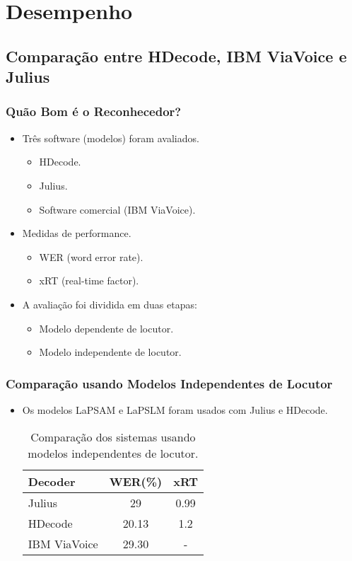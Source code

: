 \documentclass{beamer}
\begin{document}
\section{Desempenho}
\subsection[Comparação]{Comparação entre HDecode, IBM ViaVoice e Julius}
\begin{frame}
   \frametitle{Quão Bom é o Reconhecedor?}
   \begin{itemize}
      \item Três software (modelos) foram avaliados.
      \begin{itemize}
	 \item HDecode.
	 \item Julius.
	 \item Software comercial (IBM ViaVoice).
      \end{itemize}

      \item Medidas de performance.
      \begin{itemize}
	 \item WER (word error rate).
	 \item xRT (real-time factor).
      \end{itemize}

      \item A avaliação foi dividida em duas etapas:
      \begin{itemize}
	 \item Modelo dependente de locutor.
	 \item Modelo independente de locutor.
      \end{itemize}
   \end{itemize}
\end{frame}

\begin{frame}
   \frametitle{Comparação usando Modelos Independentes de Locutor}
   \begin{itemize}
      \item Os modelos LaPSAM e LaPSLM foram usados com Julius e HDecode.
      \begin{table}
	 \centering
	 \begin{tabular}{ l c c }
	    \toprule
	    \textbf{Decoder} & \textbf{WER(\%)} & \textbf{xRT} \\\midrule
	    Julius & 29 & 0.99 \\\midrule
	    HDecode & 20.13 & 1.2 \\\midrule
	    IBM ViaVoice & 29.30 & - \\
	     \bottomrule
	  \end{tabular}
	  \caption{Comparação dos sistemas usando modelos independentes de locutor.}
       \end{table}
    \end{itemize}
\end{frame}
\end{document}
